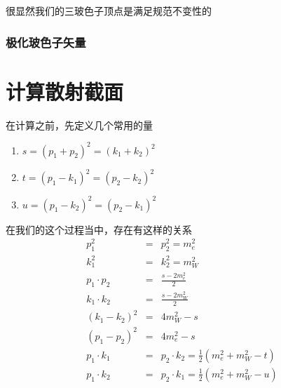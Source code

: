 \documentclass{article}
\begin{document}
很显然我们的三玻色子顶点是满足规范不变性的

\subsubsection{极化玻色子矢量}






\section{计算散射截面}
在计算之前，先定义几个常用的量
\begin{enumerate}
    \item $s = \left(p_1 + p_2\right)^2 = \left(k_1 + k_2\right)^2$
    \item $t = \left(p_1 - k_1\right)^2 = \left(p_2 - k_2\right)^2$
    \item $u = \left(p_1 - k_2\right)^2 = \left(p_2 - k_1\right)^2$
\end{enumerate}

在我们的这个过程当中，存在有这样的关系
\begin{eqnarray*}
    p_1^2 &=& p_2^2 = m_e^2 \\
    k_1^2 &=& k_2^2 = m_W^2 \\
    p_1 \cdot p_2 &=& \frac{s - 2m_e^2}{2} \\
    k_1 \cdot k_2 &=& \frac{s - 2m_W^2}{2} \\
    \left(k_1 - k_2\right)^2 &=& 4m_W^2 - s  \\
    \left(p_1 - p_2\right)^2 &=& 4m_e^2 - s \\
    p_1 \cdot k_1 &=& p_2 \cdot k_2 = \frac{1}{2}\left(m_e^2 + m_W^2 - t\right) \\
    p_1 \cdot k_2 &=& p_2 \cdot k_1 = \frac{1}{2}\left(m_e^2 + m_W^2 - u\right)
\end{eqnarray*}
\end{document}
